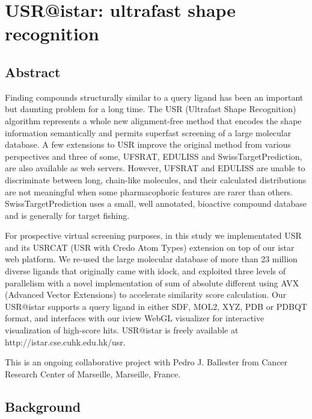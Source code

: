 \chapter{USR@istar: ultrafast shape recognition}
\label{usr}

\section{Abstract}

Finding compounds structurally similar to a query ligand has been an important but daunting problem for a long time. The USR (Ultrafast Shape Recognition) algorithm represents a whole new alignment-free method that encodes the shape information semantically and permits superfast screening of a large molecular database. A few extensions to USR improve the original method from various perspectives and three of some, UFSRAT, EDULISS and SwissTargetPrediction, are also available as web servers. However, UFSRAT and EDULISS are unable to discriminate between long, chain-like molecules, and their calculated distributions are not meaningful when some pharmacophoric features are rarer than others. SwissTargetPrediction uses a small, well annotated, bioactive compound database and is generally for target fishing.

For prospective virtual screening purposes, in this study we implementated USR and its USRCAT (USR with Credo Atom Types) extension on top of our istar web platform. We re-used the large molecular database of more than 23 million diverse ligands that originally came with idock, and exploited three levels of parallelism with a novel implementation of sum of absolute different using AVX (Advanced Vector Extensions) to accelerate similarity score calculation. Our USR@istar supports a query ligand in either SDF, MOL2, XYZ, PDB or PDBQT format, and interfaces with our iview WebGL visualizer for interactive visualization of high-score hits. USR@istar is freely available at http://istar.cse.cuhk.edu.hk/usr.

This is an ongoing collaborative project with Pedro J. Ballester from Cancer Research Center of Marseille, Marseille, France.

\section{Background}


